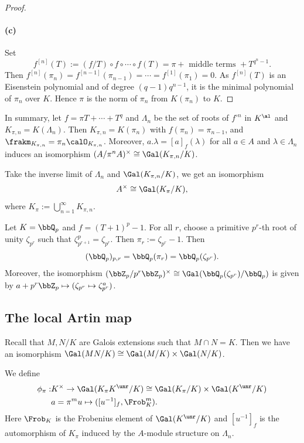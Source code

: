 \begin{proof}
    \paragraph{(c)}
    Set 
    \[ f^{[n]}(T) := (f/T) \circ f \circ \cdots \circ f(T) = \pi + \text{ middle terms } + T^{q^n - 1}. \]
    Then $f^{[n]}(\pi_n) = f^{[n-1]}(\pi_{n-1}) = \cdots = f^{[1]}(\pi_1) = 0$.
    As $f^{[n]}(T)$ is an Eisenstein polynomial and of degree $(q-1)q^{n-1}$, it is the minimal polynomial of $\pi_n$ over $K$.
    Hence $\pi$ is the norm of $\pi_n$ from $K(\pi_n)$ to $K$.
  \end{proof}

  In summary, let $f = \pi T + \cdots + T^q$ and $\Lambda_n$ be the set of roots of $f^{\circ n}$ in $K^\al$ and $K_{\pi, n} = K(\Lambda_n)$.
  Then $K_{\pi, n} = K(\pi_n)$ with $f(\pi_n) = \pi_{n-1}$, and $\frakm_{K_{\pi, n}} = \pi_n \calO_{K_{\pi, n}}$.
  Moreover, $a.\lambda = [a]_f(\lambda)$ for all $a \in A$ and $\lambda \in \Lambda_n$ induces an isomorphism $(A / \pi^n A)^\times \cong \Gal(K_{\pi, n} / K)$.

  Take the inverse limit of $\Lambda_n$ and $\Gal(K_{\pi, n} / K)$, we get an isomorphism
  \[ A^\times \cong \Gal(K_\pi / K), \]
  where $K_\pi := \bigcup_{n=1}^\infty K_{\pi, n}$.

  \begin{example}
    Let $K = \bbQ_p$ and $f = (T+1)^p - 1$.
    For all $r$, choose a primitive $p^r$-th root of unity $\zeta_{p^r}$ such that $\zeta_{p^{r+1}}^p = \zeta_{p^r}$.
    Then $\pi_r := \zeta_{p^r} - 1$.
    Then 
    \[ (\bbQ_p)_{p,r} = \bbQ_p(\pi_r) = \bbQ_p(\zeta_{p^r}). \]
    Moreover, the isomorphism $(\bbZ_p / p^r \bbZ_p)^\times \cong \Gal(\bbQ_p(\zeta_{p^r}) / \bbQ_p)$ is given by $a + p^r \bbZ_p \mapsto (\zeta_{p^r} \mapsto \zeta_{p^r}^a)$.
  \end{example}


\subsection{The local Artin map}

  Recall that $M,N/K$ are Galois extensions such that $M \cap N = K$.
  Then we have an isomorphism $\Gal(MN/K) \cong \Gal(M/K) \times \Gal(N/K)$.
  
  We define 
  \begin{align*}
    \phi_\pi : & K^\times \to \Gal(K_\pi K^\unr / K) \cong \Gal(K_\pi / K) \times \Gal(K^\unr / K) \\
    & a = \pi^m u \mapsto ([u^{-1}]_f, \Frob_K^m).
  \end{align*} 
  Here $\Frob_K$ is the Frobenius element of $\Gal(K^\unr / K)$ and $[u^{-1}]_f$ is the automorphism of $K_\pi$ induced by the $A$-module structure on $\Lambda_n$.

